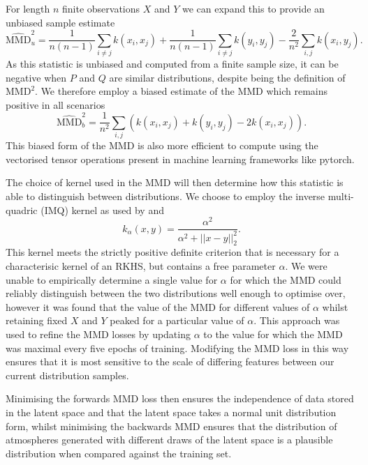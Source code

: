 For length $n$ finite observations $X$ and $Y$ we can expand this to provide an unbiased sample estimate
\begin{equation}
    \widehat{\mathrm{MMD}}_u^2 = \frac{1}{n(n-1)} \sum_{i\neq j} k(x_i, x_j) + \frac{1}{n(n-1)} \sum_{i\neq j} k(y_i, y_j) - \frac{2}{n^2} \sum_{i, j} k(x_i, y_j).
\end{equation}
As this statistic is unbiased and computed from a finite sample size, it can be negative when $P$ and $Q$ are similar distributions, despite being the definition of $\mathrm{MMD}^2$.
We therefore employ a biased estimate of the MMD which remains positive in all scenarios
\begin{equation}
    \widehat{\mathrm{MMD}}_b^2 = \frac{1}{n^2}\sum_{i, j}\left( k(x_i, x_j) + k(y_i, y_j) - 2k(x_i, x_j) \right).
\end{equation}
This biased form of the MMD is also more efficient to compute using the vectorised tensor operations present in machine learning frameworks like pytorch.

The choice of kernel used in the MMD will then determine how this statistic is able to distinguish between distributions.
We choose to employ the inverse multi-quadric (IMQ) kernel as used by \citet{2017Tolstikhin} and \citet{2018Ardizzone}
\begin{equation}
    k_\alpha(x, y) = \frac{\alpha^2}{\alpha^2 + ||x-y||_2^2}.
\end{equation}
This kernel meets the strictly positive definite criterion that is necessary for a characterisic kernel of an RKHS, but contains a free parameter $\alpha$.
We were unable to empirically determine a single value for $\alpha$ for which the MMD could reliably distinguish between the two distributions well enough to optimise over, however it was found that the value of the MMD for different values of $\alpha$ whilst retaining fixed $X$ and $Y$ peaked for a particular value of $\alpha$.
This approach was used to refine the MMD losses by updating $\alpha$ to the value for which the MMD was maximal every five epochs of training.
Modifying the MMD loss in this way ensures that it is most sensitive to the scale of differing features between our current distribution samples.

Minimising the forwards MMD loss then ensures the independence of data stored in the latent space and that the latent space takes a normal unit distribution form, whilst minimising the backwards MMD ensures that the distribution of atmospheres generated with different draws of the latent space is a plausible distribution when compared against the training set.

